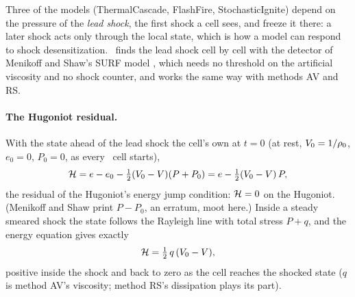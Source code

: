 Three of the models (ThermalCascade, FlashFire, StochasticIgnite) depend on
the pressure of the \emph{lead shock}, the first shock a cell sees, and
freeze it there: a later shock acts only through the local state, which is
how a model can respond to shock desensitization. \bw\ finds the lead shock
cell by cell with the detector of Menikoff and Shaw's SURF model
\cite{menikoff2010}, which needs no threshold on the artificial viscosity and
no shock counter, and works the same way with methods AV and RS.

\paragraph{The Hugoniot residual.} With the state ahead of the lead shock the
cell's own at $t = 0$ (at rest, $V_0 = 1/\rho_0$, $e_0 = 0$, $P_0 = 0$, as
every \bw\ cell starts),
\begin{equation}
  \mathcal{H} = e - e_0 - \tfrac{1}{2}(V_0 - V)(P + P_0)
       = e - \tfrac{1}{2}(V_0 - V)\,P,
  \label{eq:hugoniot-residual}
\end{equation}
the residual of the Hugoniot's energy jump condition: $\mathcal{H} = 0$ on the
Hugoniot. (Menikoff and Shaw print $P - P_0$, an erratum, moot here.) Inside
a steady smeared shock the state follows the Rayleigh line with total stress
$P + q$, and the energy equation gives exactly
\begin{equation}
  \mathcal{H} = \tfrac{1}{2}\,q\,(V_0 - V),
  \label{eq:hugoniot-q}
\end{equation}
positive inside the shock and back to zero as the cell reaches the shocked
state ($q$ is method AV's viscosity; method RS's dissipation plays its
part).

